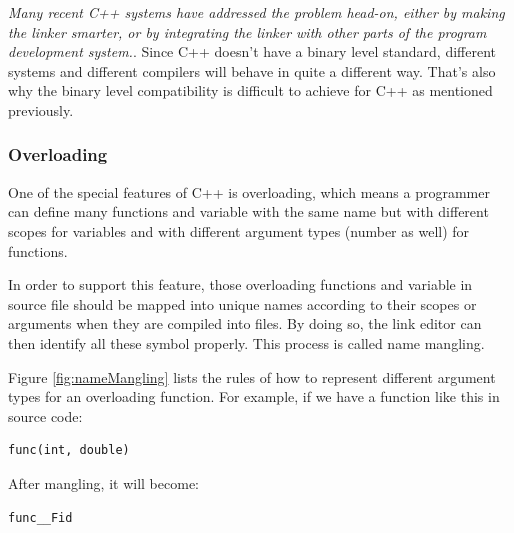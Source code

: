         \textit{Many recent C++ systems have addressed the problem head-on, either by making the linker smarter, or by integrating the linker with other parts of the program development system.}\cite{LAL-00}. Since C++ doesn't have a binary level standard, different systems and different compilers will behave in quite a different way. That's also why the binary level compatibility is difficult to achieve for C++ as mentioned previously.
        
        
        
        \subsubsection{Overloading}
        One of the special features of C++ is overloading, which means a programmer can define many functions and variable with the same name but with different scopes for variables and with different argument types (number as well) for functions. 
        
        In order to support this feature, those overloading functions and variable in source file should be mapped into unique names according to their scopes or arguments when they are compiled into files. By doing so, the link editor can then identify all these symbol properly. This process is called name mangling\cite{LAL-00}.
        
        Figure \ref{fig:nameMangling} lists the rules of how to represent different argument types for an overloading function.
        For example, if we have a function like this in source code:
        
        \begin{lstlisting}[caption = function in source file before name mangling]
    func(int, double) 
        \end{lstlisting}
        
        After mangling, it will become:
        
        \begin{lstlisting}[caption = function in object file after name mangling]
    func__Fid 
        \end{lstlisting}
        
